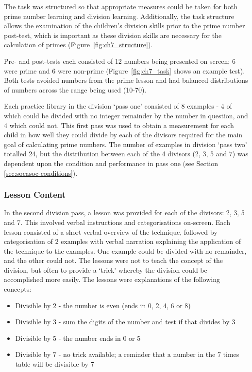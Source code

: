 The task was structured so that appropriate measures could be taken for both prime number \gls{learning} and division learning. Additionally, the task structure allows the examination of the children's division skills prior to the prime number post-test, which is important as these division skills are necessary for the calculation of primes (Figure~\ref{fig:ch7_structure}).

Pre- and post-tests each consisted of 12 numbers being presented on screen; 6 were prime and 6 were non-prime (Figure~\ref{fig:ch7_task} shows an example test). Both tests avoided numbers from the prime lesson and had balanced distributions of numbers across the range being used (10-70).

Each practice library in the division `pass one' consisted of 8 examples - 4 of which could be divided with no integer remainder by the number in question, and 4 which could not. This first pass was used to obtain a measurement for each child in how well they could divide by each of the divisors required for the main goal of calculating prime numbers. The number of examples in division `pass two' totalled 24, but the distribution between each of the 4 divisors (2, 3, 5 and 7) was dependent upon the condition and performance in pass one (see Section \ref{sec:socasoc-conditions}).

\subsubsection{Lesson Content}\label{sec:socasoc-lessons}
In the second division pass, a lesson was provided for each of the divisors: 2, 3, 5 and 7. This involved verbal instructions and categorisations on-screen. Each lesson consisted of a short verbal overview of the technique, followed by categorisation of 2 examples with verbal narration explaining the application of the technique to the examples. One example could be divided with no remainder, and the other could not. The lessons were not to teach the concept of the division, but often to provide a `trick' whereby the division could be accomplished more easily. The lessons were explanations of the following concepts:
\begin{itemize}
	\item Divisible by 2 - the number is even (ends in 0, 2, 4, 6 or 8)
	\item Divisible by 3 - sum the digits of the number and test if that divides by 3
	\item Divisible by 5 - the number ends in 0 or 5
	\item Divisible by 7 - no trick available; a reminder that a number in the 7 times table will be divisible by 7
\end{itemize}

